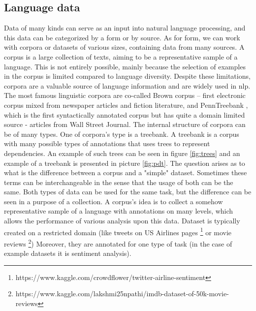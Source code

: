 \subsection{Language data}
Data of many kinds can serve as an input into natural language processing, and this data can be categorized by a form or by source.
As for form, we can work with corpora or datasets of various sizes, containing data from many sources. A corpus is a large collection of texts, aiming to be a representative sample of a language. This is not entirely possible, mainly because the selection of examples in the corpus is limited compared to language diversity. Despite these limitations, corpora are a valuable source of language information and are widely used in \acrshort{nlp}. The most famous linguistic corpora are co-called Brown corpus \citep{francis79browncorpus} -- first electronic corpus mixed from newspaper articles and fiction literature, and PennTreebank \citep{Marcus1993}, which is the first syntactically annotated corpus but has quite a domain limited source - articles from Wall Street Journal. The internal structure of corpora can be of many types. One of corpora's type is a treebank. A treebank is a corpus with many possible types of annotations that uses trees to represent dependencies. An example of such trees can be seen in figure \ref{fig:trees} and an example of a treebank is presented in picture \ref{fig:pdt}.
The question arises as to what is the difference between a corpus and a "simple" dataset. Sometimes these terms can be interchangeable in the sense that the usage of both can be the same. Both types of data can be used for the same task, but the difference can be seen in a purpose of a collection. A corpus's idea is to collect a somehow representative sample of a language with annotations on many levels, which allows the performance of various analysis upon this data. Dataset is typically created on a restricted domain (like tweets on US Airlines pages \footnote{https://www.kaggle.com/crowdflower/twitter-airline-sentiment} or movie reviews \footnote{https://www.kaggle.com/lakshmi25npathi/imdb-dataset-of-50k-movie-reviews}) 
Moreover, they are annotated for one type of task (in the case of example datasets it is sentiment analysis).  

